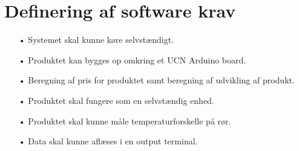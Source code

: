 \section{Definering af software krav}
\begin{enumerate}
	\item[•]Systemet skal kunne køre selvstændigt.
	\item[•]Produktet kan bygges op omkring et UCN Arduino board.
	\item[•]Beregning af pris for produktet samt beregning af udvikling af       produkt.
	\item[•]Produktet skal fungere som en selvstændig enhed.
	\item[•]Produktet skal kunne måle temperaturforskelle på rør.
	\item[•]Data skal kunne aflæses i en output terminal.
\end{enumerate}
